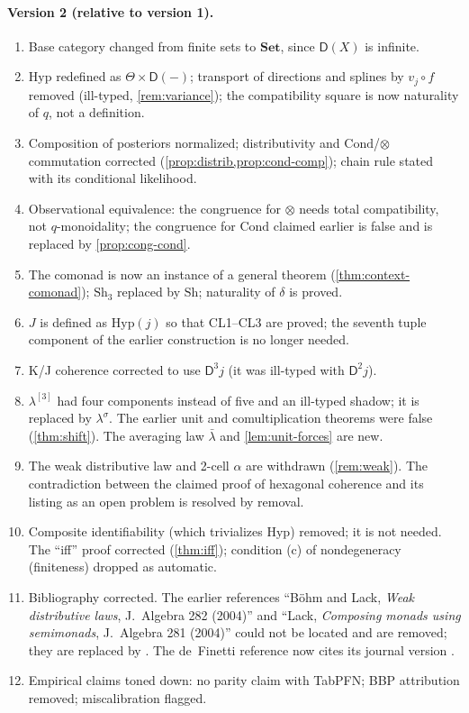 \documentclass[11pt]{article}
\theoremstyle{definition}
\theoremstyle{remark}
\newcommand{\D}{\mathsf{D}}
\newcommand{\Set}{\mathbf{Set}}
\newcommand{\Hyp}{\mathrm{Hyp}}
\newcommand{\Sh}{\mathrm{Sh}}
\newcommand{\Cond}{\mathrm{Cond}}
\newcommand{\lb}{\bar\lambda}
\newcommand{\ls}{\lambda^{\sigma}}
\begin{document}
\paragraph{Version 2 (relative to version 1).}
\begin{enumerate}[leftmargin=*]
\item Base category changed from finite sets to $\Set$, since $\D(X)$ is infinite.
\item $\Hyp$ redefined as $\Theta\times\D(-)$; transport of directions and splines by $v_j\circ f$
  removed (ill-typed, \cref{rem:variance}); the compatibility square is now naturality of $q$, not a
  definition.
\item Composition of posteriors normalized; distributivity and $\Cond$/$\otimes$ commutation
  corrected (\cref{prop:distrib,prop:cond-comp}); chain rule stated with its conditional likelihood.
\item Observational equivalence: the congruence for $\otimes$ needs total compatibility, not
  $q$-monoidality; the congruence for $\Cond$ claimed earlier is false and is replaced by
  \cref{prop:cong-cond}.
\item The comonad is now an instance of a general theorem (\cref{thm:context-comonad}); $\Sh_3$
  replaced by $\Sh$; naturality of $\delta$ is proved.
\item $J$ is defined as $\Hyp(j)$ so that CL1--CL3 are proved; the seventh tuple component of the
  earlier construction is no longer needed.
\item K/J coherence corrected to use $\D^3j$ (it was ill-typed with $\D^2j$).
\item $\lambda^{[3]}$ had four components instead of five and an ill-typed shadow; it is replaced by
  $\ls$. The earlier unit and comultiplication theorems were false (\cref{thm:shift}). The averaging
  law $\lb$ and \cref{lem:unit-forces} are new.
\item The weak distributive law and 2-cell $\alpha$ are withdrawn (\cref{rem:weak}). The contradiction
  between the claimed proof of hexagonal coherence and its listing as an open problem is resolved by
  removal.
\item Composite identifiability (which trivializes $\Hyp$) removed; it is not needed. The
  ``iff'' proof corrected (\cref{thm:iff}); condition (c) of nondegeneracy (finiteness) dropped as
  automatic.
\item Bibliography corrected. The earlier references ``B\"ohm and Lack, \emph{Weak distributive laws},
  J.~Algebra 282 (2004)'' and ``Lack, \emph{Composing monads using semimonads}, J.~Algebra 281 (2004)''
  could not be located and are removed; they are replaced by \cite{Street2009,Bohm2010,
  BohmLackStreet2011,Garner2020,GoyPetrisan2020,PowerWatanabe2002,Beck1969}. The de~Finetti reference
  now cites its journal version \cite{FGP2021}.
\item Empirical claims toned down: no parity claim with TabPFN; BBP attribution removed;
  miscalibration flagged.
\end{enumerate}
\end{document}
